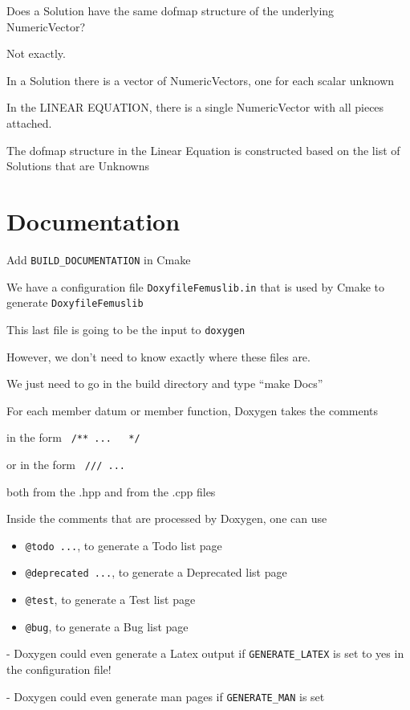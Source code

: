 \documentclass[10pt]{book}
\begin{document}
     
     Does a Solution have the same dofmap structure of the underlying NumericVector?
     
     Not exactly.
     
     In a Solution there is a vector of NumericVectors, one for each scalar unknown
     
     In the LINEAR EQUATION, there is a single NumericVector with all pieces attached.
     
     The dofmap structure in the Linear Equation is constructed based on the list of Solutions that are Unknowns
     
  
  

  \chapter{Documentation}
  
  Add \verb|BUILD_DOCUMENTATION| in Cmake
  
  We have a configuration file \verb|DoxyfileFemuslib.in|
  that is used by Cmake to generate \verb|DoxyfileFemuslib|
  
  This last file is going to be the input to \verb|doxygen|
  
  However, we don't need to know exactly where these files are.
  
  We just need to go in the build directory and type ``make Docs''
  
  For each member datum or member function, 
   Doxygen takes the comments 
   
    in the form \verb| /** ...   */ |
    
    or in the form \verb| /// ... |
    
    both from the .hpp and from the .cpp files
  
    Inside the comments that are processed by Doxygen, one can use 
    \begin{itemize}
     \item 
        \verb|@todo ...|, to generate a Todo list page
     \item 
        \verb|@deprecated ...|, to generate a Deprecated list page
     \item 
        \verb|@test|, to generate a Test list page
     \item 
        \verb|@bug|, to generate a Bug list page
    \end{itemize}
  

    
    - Doxygen could even generate a Latex output if \verb|GENERATE_LATEX| is set to yes in the configuration file!

  - Doxygen could even generate man pages if \verb|GENERATE_MAN| is set
  
  
  
\end{document}
